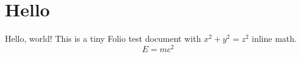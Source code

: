 \documentclass{article}
\begin{document}
\section{Hello}
Hello, world! This is a tiny Folio test document with $x^2 + y^2 = z^2$ inline math.
\begin{equation}
  E = mc^2
\end{equation}
\end{document}
